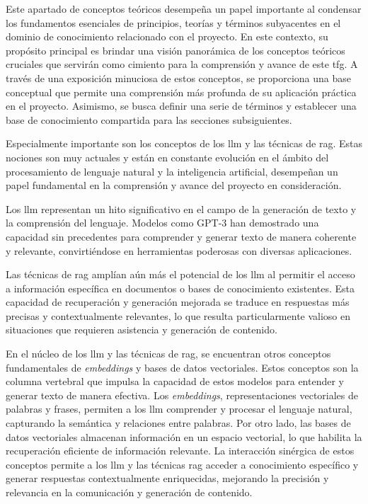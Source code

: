 
Este apartado de conceptos teóricos desempeña un papel importante al condensar los fundamentos esenciales de principios, teorías y términos subyacentes en el dominio de conocimiento relacionado con el proyecto. En este contexto, su propósito principal es brindar una visión panorámica de los conceptos teóricos cruciales que servirán como cimiento para la comprensión y avance de este \acrlong{tfg}. A través de una exposición minuciosa de estos conceptos, se proporciona una base conceptual que permite una comprensión más profunda de su aplicación práctica en el proyecto. Asimismo, se busca definir una serie de términos y establecer una base de conocimiento compartida para las secciones subsiguientes.

Especialmente importante son los conceptos de los \acrfull{llm} y las técnicas de \acrfull{rag}. Estas nociones son muy actuales y están en constante evolución en el ámbito del procesamiento de lenguaje natural y la inteligencia artificial, desempeñan un papel fundamental en la comprensión y avance del proyecto en consideración.

Los \acrshort{llm} representan un hito significativo en el campo de la generación de texto y la comprensión del lenguaje. Modelos como GPT-3 han demostrado una capacidad sin precedentes para comprender y generar texto de manera coherente y relevante, convirtiéndose en herramientas poderosas con diversas aplicaciones.

Las técnicas de \acrshort{rag} amplían aún más el potencial de los \acrshort{llm} al permitir el acceso a información específica en documentos o bases de conocimiento existentes. Esta capacidad de recuperación y generación mejorada se traduce en respuestas más precisas y contextualmente relevantes, lo que resulta particularmente valioso en situaciones que requieren asistencia y generación de contenido.

En el núcleo de los \acrshort{llm} y las técnicas de \acrshort{rag}, se encuentran otros conceptos fundamentales de \textit{embeddings} y bases de datos vectoriales. Estos conceptos son la columna vertebral que impulsa la capacidad de estos modelos para entender y generar texto de manera efectiva. Los \textit{embeddings}, representaciones vectoriales de palabras y frases, permiten a los \acrshort{llm} comprender y procesar el lenguaje natural, capturando la semántica y relaciones entre palabras. Por otro lado, las bases de datos vectoriales almacenan información en un espacio vectorial, lo que habilita la recuperación eficiente de información relevante. La interacción sinérgica de estos conceptos permite a los \acrshort{llm} y las técnicas \acrshort{rag} acceder a conocimiento específico y generar respuestas contextualmente enriquecidas, mejorando la precisión y relevancia en la comunicación y generación de contenido.

